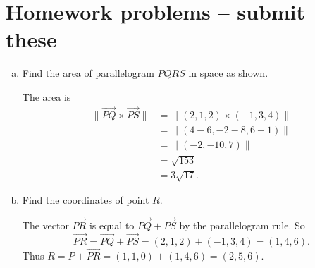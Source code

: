\newpage

\section{Homework problems -- submit these}

\begin{problem}
  \leavevmode
  \begin{enumerate}[(a)]
    \item Find the area of parallelogram $PQRS$ in space as shown.
    \begin{center}
    \end{center}
    \begin{solution}
      The area is
      \[\begin{split}
        \|\overrightarrow{PQ}\times\overrightarrow{PS}\| &= \|(2,1,2)\times(-1,3,4)\| \\
        &= \|(4-6,-2-8,6+1)\|\\
        &= \|(-2,-10,7)\|\\
        &= \sqrt{153}\\
        &= 3\sqrt{17}.
      \end{split}\]
    \end{solution}

    \item Find the coordinates of point $R$.
    \begin{solution}
      The vector $\overrightarrow{PR}$ is equal to $\overrightarrow{PQ}+\overrightarrow{PS}$ by the parallelogram rule. So
      \[\overrightarrow{PR}=\overrightarrow{PQ}+\overrightarrow{PS}=(2,1,2)+(-1,3,4)=(1,4,6).\]
      Thus $R=P+\overrightarrow{PR}=(1,1,0)+(1,4,6)=(2,5,6)$.
    \end{solution}
  \end{enumerate}
\end{problem}

